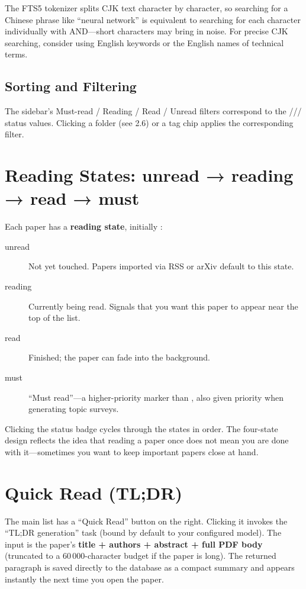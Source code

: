 \begin{tipbox}
The FTS5  tokenizer splits CJK text character by character, so searching
for a Chinese phrase like ``neural network'' is equivalent to searching for each character
individually with AND---short characters may bring in noise. For precise CJK searching,
consider using English keywords or the English names of technical terms.
\end{tipbox}

\subsection{Sorting and Filtering}

The sidebar's Must-read / Reading / Read / Unread filters correspond to the
/// status values. Clicking a folder
(see 2.6) or a tag chip applies the corresponding filter.

\section{Reading States: unread → reading → read → must}

Each paper has a \textbf{reading state}, initially :

\begin{description}
  \item[unread] Not yet touched. Papers imported via RSS or arXiv default to this state.
  \item[reading] Currently being read. Signals that you want this paper to appear
    near the top of the list.
  \item[read] Finished; the paper can fade into the background.
  \item[must] ``Must read''---a higher-priority marker than , also given
    priority when generating topic surveys.
\end{description}

Clicking the status badge cycles through the states in order. The four-state design
reflects the idea that reading a paper once does not mean you are done with it---sometimes
you want to keep important papers close at hand.

\section{Quick Read (TL;DR)}

The main list has a ``Quick Read'' button on the right. Clicking it invokes the
``TL;DR generation'' task (bound by default to your configured  model).
The input is the paper's \textbf{title + authors + abstract + full PDF body} (truncated
to a 60\,000-character budget if the paper is long). The returned paragraph is saved
directly to the database as a compact summary and appears instantly the next time you
open the paper.

